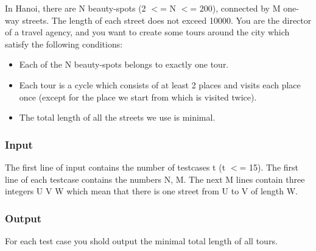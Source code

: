 

In Hanoi, there are N beauty-spots (2 $<$= N $<$= 200), connected by M one-way streets. The length of each street does not exceed 10000. You are the director of a travel agency, and you want to create some tours around the city which satisfy the following conditions:

 
\begin{itemize}
	\item  Each of the N beauty-spots belongs to exactly one tour.

 
	\item  Each tour is a cycle which consists of at least 2 places and visits each place once (except for the place we start from which is visited twice). 

 
	\item  The total length of all the streets we use is minimal.

 
\end{itemize}

\subsubsection{Input}

The first line of input contains the number of testcases t (t $<$= 15). The first line of each testcase contains the numbers N, M. The next M lines contain three integers U V W which mean that there is one street from U to V of length W. 

 

\subsubsection{Output}

For each test case you shold output the minimal total length of all tours.

 

